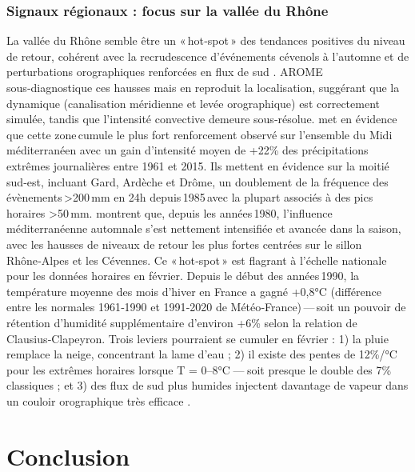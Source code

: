 \documentclass[
  article,
  nofooter,
  noheadings]{jss}
\begin{document}
\subsubsection{Signaux régionaux : focus sur la vallée du
Rhône}\label{signaux-ruxe9gionaux-focus-sur-la-valluxe9e-du-rhuxf4ne}

La vallée du Rhône semble être un «\,hot‑spot\,» des tendances positives
du niveau de retour, cohérent avec la recrudescence d'événements
cévenols à l'automne et de perturbations orographiques renforcées en
flux de sud \citep{Fresnay2012}. AROME sous‑diagnostique ces hausses
mais en reproduit la localisation, suggérant que la dynamique
(canalisation méridienne et levée orographique) est correctement
simulée, tandis que l'intensité convective demeure sous‑résolue.
\citet{Ribes2019} met en évidence que cette zone\,cumule le plus fort
renforcement observé sur l'ensemble du Midi méditerranéen avec un gain
d'intensité moyen de +22\% des précipitations extrêmes journalières
entre 1961 et 2015. Ils mettent en évidence sur la moitié sud‑est,
incluant Gard, Ardèche et Drôme, un doublement de la fréquence des
évènements\,\textgreater200\,mm en 24h depuis\,1985\,avec la plupart
associés à des pics horaires \textgreater50\,mm.
\citet{blanchet2021explaining} montrent que, depuis les années\,1980,
l'influence méditerranéenne automnale s'est nettement intensifiée et
avancée dans la saison, avec les hausses de niveaux de retour les plus
fortes centrées sur le sillon Rhône‑Alpes et les Cévennes. Ce
«\,hot‑spot\,» est flagrant à l'échelle nationale pour les données
horaires en février. Depuis le début des années\,1990, la température
moyenne des mois d'hiver en France a gagné +0,8°C (différence entre les
normales 1961‑1990 et 1991‑2020 de Météo‑France)\,---\,soit un pouvoir
de rétention d'humidité supplémentaire d'environ +6\% selon la relation
de Clausius‑Clapeyron. Trois leviers pourraient se cumuler en février :
1) la pluie remplace la neige, concentrant la lame d'eau
\citep{ZAQOUT2024131439} ; 2) il existe des pentes de 12\%/°C pour les
extrêmes horaires lorsque T = 0--8°C --- soit presque le double des 7\%
classiques \citep{Drobinski2016} ; et 3) des flux de sud plus humides
injectent davantage de vapeur dans un couloir orographique très efficace
\citep{LorentePlazas2020}.

\section{Conclusion}\label{conclusion}
\end{document}
